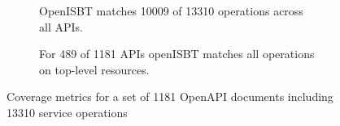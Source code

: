 \begin{figure}
\centering
\begin{subfigure}[t]{.48\textwidth}
  \centering
  \caption{OpenISBT matches 10009 of 13310 operations across all APIs.}
  \label{fig:analysis1_sub_pie_coverage_sup_operations_main}
\end{subfigure}%
\hfill
\begin{subfigure}[t]{.48\textwidth}
  \centering
  \caption{For 489 of 1181 APIs openISBT matches all operations on top-level resources.}
  \label{fig:analysis1_sub_pie_coverage_full_sup_apis_main}
\end{subfigure}%
\caption{Coverage metrics for a set of 1181 OpenAPI documents including 13310 service operations}
\label{fig:analysis1_pie_both_criteria_main}
\end{figure}
